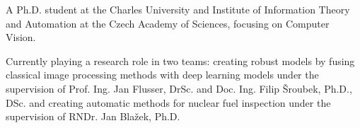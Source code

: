 

\begin{cvparagraph}

A Ph.D. student at the Charles University and Institute of Information Theory and Automation at the Czech Academy of Sciences, focusing on Computer Vision. 

Currently playing a research role in two teams: creating robust models by fusing classical image processing methods with deep learning models under the supervision of Prof. Ing. Jan Flusser, DrSc. and Doc. Ing. Filip Šroubek, Ph.D., DSc. and creating automatic methods for nuclear fuel inspection under the supervision of RNDr. Jan Blažek, Ph.D. 
\end{cvparagraph}